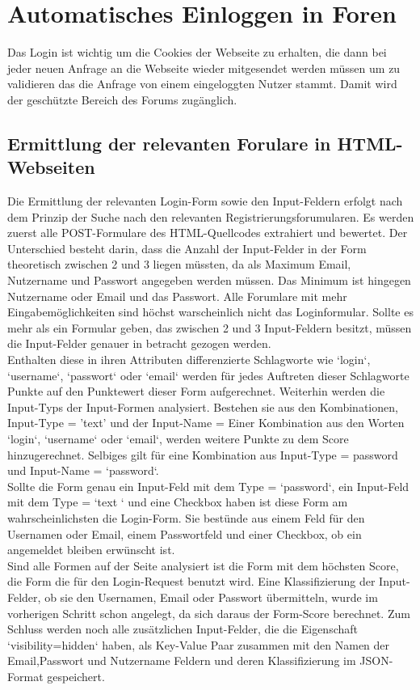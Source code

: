 \section {Automatisches Einloggen in Foren}
 Das Login ist wichtig um die Cookies der Webseite zu erhalten, die dann bei jeder neuen Anfrage an die Webseite wieder mitgesendet werden müssen um zu validieren das die Anfrage von einem eingeloggten Nutzer stammt. Damit wird der geschützte Bereich des Forums zugänglich.
\subsection{Ermittlung der relevanten Forulare in HTML-Webseiten}
Die Ermittlung der relevanten Login-Form sowie den Input-Feldern erfolgt nach dem Prinzip der Suche nach den relevanten Registrierungsforumularen. Es werden zuerst alle POST-Formulare des HTML-Quellcodes extrahiert und bewertet. Der Unterschied besteht darin, dass die Anzahl der Input-Felder in der Form theoretisch zwischen 2 und 3 liegen müssten, da als Maximum Email, Nutzername und Passwort angegeben werden müssen. Das Minimum ist hingegen Nutzername oder Email und das Passwort. Alle Forumlare mit mehr Eingabemöglichkeiten sind höchst warscheinlich nicht das Loginformular.
Sollte es mehr als ein Formular geben, das zwischen 2 und 3 Input-Feldern besitzt, müssen die Input-Felder genauer in betracht gezogen werden. \\
Enthalten diese in ihren Attributen differenzierte Schlagworte wie `login`, `username`, `passwort` oder `email` werden für jedes Auftreten dieser Schlagworte Punkte auf den Punktewert dieser Form aufgerechnet. Weiterhin werden die Input-Typs der Input-Formen analysiert. Bestehen sie aus den Kombinationen, Input-Type = 'text' und der Input-Name = Einer Kombination aus den Worten  `login`, `username` oder `email`, werden weitere Punkte zu dem Score hinzugerechnet. Selbiges gilt für eine Kombination aus Input-Type = password und Input-Name = `password`.\\
Sollte die Form genau ein Input-Feld mit dem Type = `password`, ein Input-Feld mit dem Type = `text ` und eine Checkbox haben ist diese Form am wahrscheinlichsten die Login-Form. Sie bestünde aus einem Feld für den Usernamen oder Email, einem Passwortfeld und einer Checkbox, ob ein angemeldet bleiben erwünscht ist.\\
Sind alle Formen auf der Seite analysiert ist die Form mit dem höchsten Score, die Form die für den Login-Request benutzt wird. Eine Klassifizierung der Input-Felder, ob sie den Usernamen, Email oder Passwort übermitteln, wurde im vorherigen Schritt schon angelegt, da sich daraus der Form-Score berechnet. Zum Schluss werden noch alle zusätzlichen Input-Felder, die die Eigenschaft `visibility=hidden` haben, als Key-Value Paar zusammen mit den Namen der Email,Passwort und Nutzername Feldern und deren Klassifizierung im JSON-Format gespeichert.
